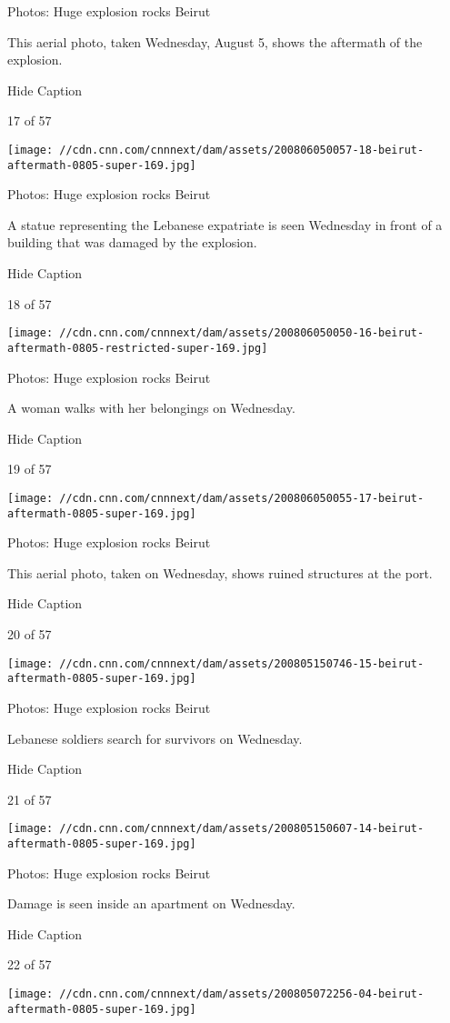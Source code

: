 Photos: Huge explosion rocks Beirut

This aerial photo, taken Wednesday, August 5, shows the aftermath of the
explosion.

Hide Caption

17 of 57

\texttt{[image: //cdn.cnn.com/cnnnext/dam/assets/200806050057-18-beirut-aftermath-0805-super-169.jpg]}

Photos: Huge explosion rocks Beirut

A statue representing the Lebanese expatriate is seen Wednesday in front
of a building that was damaged by the explosion.

Hide Caption

18 of 57

\texttt{[image: //cdn.cnn.com/cnnnext/dam/assets/200806050050-16-beirut-aftermath-0805-restricted-super-169.jpg]}

Photos: Huge explosion rocks Beirut

A woman walks with her belongings on Wednesday.

Hide Caption

19 of 57

\texttt{[image: //cdn.cnn.com/cnnnext/dam/assets/200806050055-17-beirut-aftermath-0805-super-169.jpg]}

Photos: Huge explosion rocks Beirut

This aerial photo, taken on Wednesday, shows ruined structures at the
port.

Hide Caption

20 of 57

\texttt{[image: //cdn.cnn.com/cnnnext/dam/assets/200805150746-15-beirut-aftermath-0805-super-169.jpg]}

Photos: Huge explosion rocks Beirut

Lebanese soldiers search for survivors on Wednesday.

Hide Caption

21 of 57

\texttt{[image: //cdn.cnn.com/cnnnext/dam/assets/200805150607-14-beirut-aftermath-0805-super-169.jpg]}

Photos: Huge explosion rocks Beirut

Damage is seen inside an apartment on Wednesday.

Hide Caption

22 of 57

\texttt{[image: //cdn.cnn.com/cnnnext/dam/assets/200805072256-04-beirut-aftermath-0805-super-169.jpg]}

